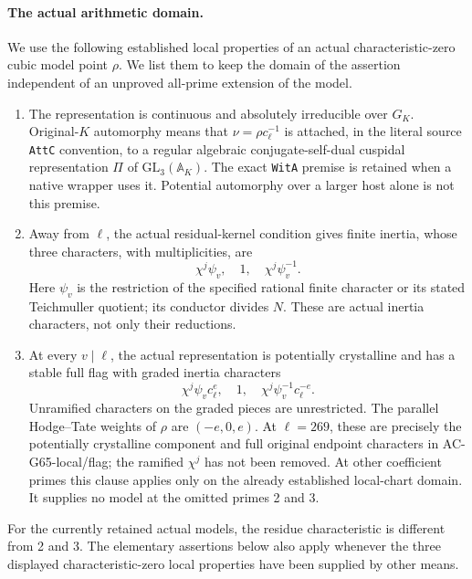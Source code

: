 \paragraph{The actual arithmetic domain.}
We use the following established local properties of an actual
characteristic-zero cubic model point \(\rho\).  We list them to keep
the domain of the assertion independent of an unproved all-prime
extension of the model.
\begin{enumerate}
\item The representation is continuous and absolutely irreducible over
\(G_K\).  Original-\(K\) automorphy means that
\(\nu=\rho c_\ell^{-1}\) is attached, in the literal source
\texttt{AttC} convention, to a regular algebraic conjugate-self-dual
cuspidal representation \(\Pi\) of \(\mathrm{GL}_3(\mathbb A_K)\).
The exact \texttt{WitA} premise is retained when a native wrapper uses it.
Potential automorphy over a larger host alone is not this premise.
\item Away from \(\ell\), the actual residual-kernel condition gives
finite inertia, whose three characters, with multiplicities, are
\[
     \chi^j\psi_v,\quad 1,\quad\chi^j\psi_v^{-1}.
     \tag{G112.2}
\]
Here \(\psi_v\) is the restriction of the specified rational finite
character or its stated Teichmuller quotient; its conductor divides
\(N\).  These are actual inertia characters, not only their reductions.
\item At every \(v\mid\ell\), the actual representation is potentially
crystalline and has a stable full flag with graded inertia characters
\[
    \chi^j\psi_v c_\ell^e,\quad1,\quad
    \chi^j\psi_v^{-1}c_\ell^{-e}.
    \tag{G112.3}
\]
Unramified characters on the graded pieces are unrestricted.  The
parallel Hodge--Tate weights of \(\rho\) are \((-e,0,e)\).
At \(\ell=269\), these are precisely the potentially crystalline
component and full original endpoint characters in AC-G65-local/flag;
the ramified \(\chi^j\) has not been removed.  At other coefficient
primes this clause applies only on the already established local-chart
domain.  It supplies no model at the omitted primes 2 and 3.
\end{enumerate}
For the currently retained actual models, the residue characteristic is
different from 2 and 3.  The elementary assertions below also apply
whenever the three displayed characteristic-zero local properties have
been supplied by other means.

